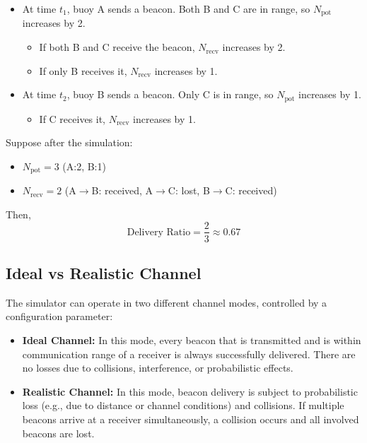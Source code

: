 \documentclass{article}
\begin{document}
\begin{itemize}
    \item At time $t_1$, buoy A sends a beacon. Both B and C are in range, so $N_\text{pot}$ increases by 2.
    \begin{itemize}
        \item If both B and C receive the beacon, $N_\text{recv}$ increases by 2.
        \item If only B receives it, $N_\text{recv}$ increases by 1.
    \end{itemize}
    \item At time $t_2$, buoy B sends a beacon. Only C is in range, so $N_\text{pot}$ increases by 1.
    \begin{itemize}
        \item If C receives it, $N_\text{recv}$ increases by 1.
    \end{itemize}
\end{itemize}

Suppose after the simulation:
\begin{itemize}
    \item $N_\text{pot} = 3$ (A:2, B:1)
    \item $N_\text{recv} = 2$ (A$\rightarrow$B: received, A$\rightarrow$C: lost, B$\rightarrow$C: received)
\end{itemize}

Then,
\[
\text{Delivery Ratio} = \frac{2}{3} \approx 0.67
\]

\subsection*{Ideal vs Realistic Channel}

The simulator can operate in two different channel modes, controlled by a configuration parameter:

\begin{itemize}
    \item \textbf{Ideal Channel:} In this mode, every beacon that is transmitted and is within communication range of a receiver is always successfully delivered. There are no losses due to collisions, interference, or probabilistic effects.
    \item \textbf{Realistic Channel:} In this mode, beacon delivery is subject to probabilistic loss (e.g., due to distance or channel conditions) and collisions. If multiple beacons arrive at a receiver simultaneously, a collision occurs and all involved beacons are lost.
\end{itemize}
\end{document}
